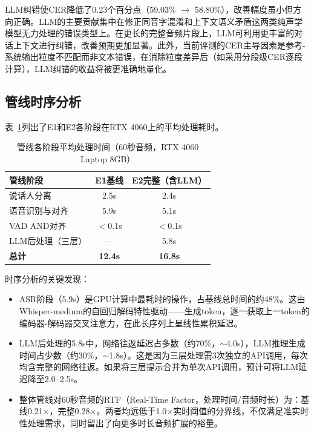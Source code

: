 \documentclass[12pt, a4paper]{article}
\begin{document}
LLM纠错使CER降低了0.23个百分点（59.03\% $\rightarrow$ 58.80\%），改善幅度虽小但方向正确。LLM的主要贡献集中在修正同音字混淆和上下文语义矛盾这两类纯声学模型无力处理的错误类型上。在更长的完整音频片段上，LLM可利用更丰富的对话上下文进行纠错，改善预期更加显著。此外，当前评测的CER主导因素是参考-系统输出粒度不匹配而非文本错误，在消除粒度差异后（如采用分段级CER逐段计算），LLM纠错的收益将被更准确地量化。

\subsection{管线时序分析}

表~\ref{tab:timing}列出了E1和E2各阶段在RTX 4060上的平均处理耗时。

\begin{table}[H]
\centering
\caption{管线各阶段平均处理时间（60秒音频，RTX 4060 Laptop 8GB）}
\label{tab:timing}
\begin{tabular}{lcc}
\toprule
\textbf{管线阶段} & \textbf{E1基线} & \textbf{E2完整（含LLM）} \\
\midrule
说话人分离 & 2.5s & 2.4s \\
语音识别与对齐 & 5.9s & 5.1s \\
VAD AND对齐 & $<$0.1s & $<$0.1s \\
LLM后处理（三层） & — & 5.8s \\
\midrule
\textbf{总计} & \textbf{12.4s} & \textbf{16.8s} \\
\bottomrule
\end{tabular}
\end{table}

时序分析的关键发现：
\begin{itemize}
    \item ASR阶段（5.9s）是GPU计算中最耗时的操作，占基线总时间的约48\%。这由Whisper-medium的自回归解码特性驱动——生成token，逐一获取上一token的编码器-解码器交叉注意力，在此长序列上呈线性累积延迟。
    \item LLM后处理的5.8s中，网络往返延迟占多数（约70\%，$\sim$4.0s），LLM推理生成时间占少数（约30\%，$\sim$1.8s）。这是因为三层处理需3次独立的API调用，每次均含完整的网络往返。如果将三层提示合并为单次API调用，预计可将LLM延迟降至2.0--2.5s。
    \item 整体管线对60秒音频的RTF（Real-Time Factor，处理时间/音频时长）为：基线0.21$\times$，完整0.28$\times$。两者均远低于1.0$\times$实时阈值的分界线，不仅满足准实时性处理需求，同时留出了向更多时长音频扩展的裕量。
\end{itemize}
\end{document}
